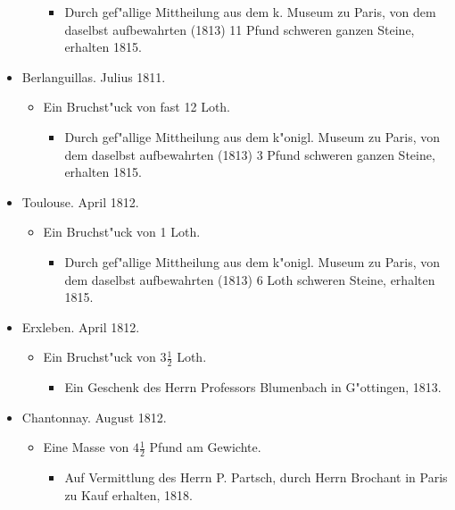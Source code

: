 \documentclass[a4paper, 11pt, oneside, polutonikogreek, german]{article}
\begin{document}
\begin{itemize}
\begin{itemize}
\begin{itemize}
            \item Durch gef"allige Mittheilung aus dem k. Museum zu Paris, von dem daselbst aufbewahrten (1813) 11 Pfund schweren ganzen Steine, erhalten 1815.
        \end{itemize}
    \end{itemize}
    \item Berlanguillas. Julius 1811.
    \begin{itemize}
        \item Ein Bruchst"uck von fast 12 Loth.
        \begin{itemize}
            \item Durch gef"allige Mittheilung aus dem k"onigl. Museum zu Paris, von dem daselbst aufbewahrten (1813) 3 Pfund schweren ganzen Steine, erhalten 1815.
        \end{itemize}
    \end{itemize}
    \item Toulouse. April 1812.
    \begin{itemize}
        \item Ein Bruchst"uck von 1 Loth.
        \begin{itemize}
            \item Durch gef"allige Mittheilung aus dem k"onigl. Museum zu Paris, von dem daselbst aufbewahrten (1813) 6 Loth schweren Steine, erhalten 1815.
        \end{itemize}
    \end{itemize}
    \item Erxleben. April 1812.
    \begin{itemize}
        \item Ein Bruchst"uck von $\mathfrak{3\frac{1}{2}}$ Loth.
        \begin{itemize}
            \item Ein Geschenk des Herrn Professors Blumenbach in G"ottingen, 1813.
        \end{itemize}
    \end{itemize}
    \item Chantonnay. August 1812.
    \begin{itemize}
        \item Eine Masse von $\mathfrak{4\frac{1}{2}}$ Pfund am Gewichte.
        \begin{itemize}
            \item Auf Vermittlung des Herrn P. Partsch, durch Herrn Brochant in Paris zu Kauf erhalten, 1818.
        \end{itemize}

\end{itemize}
\end{itemize}
\end{document}
